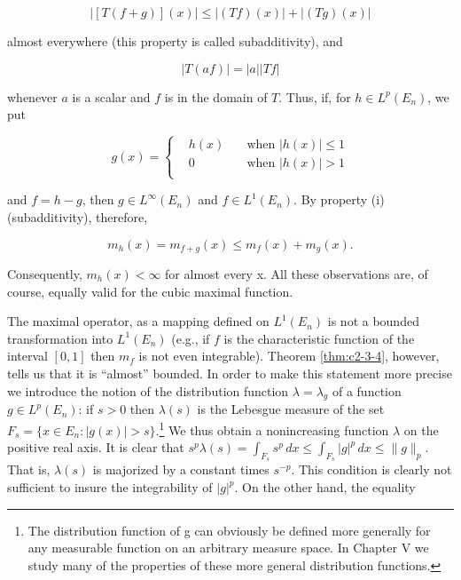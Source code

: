 \begin{equation}
\tag{i}
|[T(f+g)](x)|\leq|(T f)(x)|+|(T g)(x)|
\end{equation}

almost everywhere (this property is called subadditivity), and

\begin{equation}
\tag{ii}
|T(af)|=|a||Tf|
\end{equation}

whenever $a$ is a scalar and $f$ is in the domain of $T$. Thus, if, for $h \in L^{p}(E_{n})$, we put

\[
g(x)=\left\{\begin{aligned}{}&{{}h(x)}&{\quad\text{when }|h(x)| \leq1}\\ {}&{{}0}&{\quad\text{when }|h(x)| >1}\\ \end{aligned}\right.
\]

and $f = h - g$, then $g \in L^\infty(E_n)$ and $f \in L^1(E_n)$. By property (i) (subadditivity), therefore,

\[
m_{h}(x)=m_{f+g}(x)\leq m_{f}(x)+m_{g}(x).
\]

Consequently, $m_h(x) < \infty$ for almost every x. All these observations are, of course, equally valid for the cubic maximal function.

The maximal operator, as a mapping defined on $L^1(E_n)$ is not a bounded transformation into $L^1(E_n)$ (e.g., if $f$ is the characteristic function of the interval $[0,1]$ then $m_f$ is not even integrable). Theorem \ref{thm:c2-3-4}, however, tells us that it is ``almost'' bounded. In order to make this statement more precise we introduce the notion of the distribution function $\lambda = \lambda_g$ of a function $g \in L^p(E_n)$: if $s > 0$ then $\lambda(s)$ is the Lebesgue measure of the set $F_s = \{x \in E_n: |g(x)| > s\}$.\footnote{The distribution function of g can obviously be defined more generally for any measurable function on an arbitrary measure space. In Chapter V we study many of the properties of these more general distribution functions.} We thus obtain a nonincreasing function $\lambda$ on the positive real axis. It is clear that $s^{p}\lambda(s) = \int_{F_s} s^p \, dx \leq \int_{F_s} |g|^p \, dx \leq \|g\|_p$. That is, $\lambda(s)$ is majorized by a constant times $s^{-p}$. This condition is clearly not sufficient to insure the integrability of $|g|^p$. On the other hand, the equality

